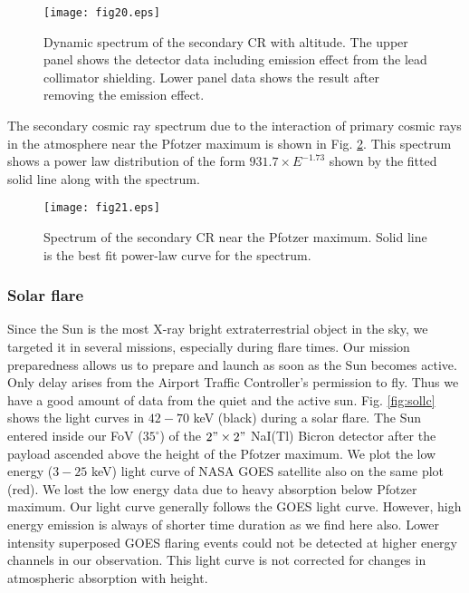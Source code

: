 \begin{figure}[h]
  \centering
  \texttt{[image: fig20.eps]}
  \caption{Dynamic spectrum of the secondary CR with altitude. The upper panel
  shows the detector data including emission effect from the lead collimator 
  shielding. Lower panel data shows the result after removing the emission effect.
  }
  \label{fig:crspec}
\end{figure}

The secondary cosmic ray spectrum due to the interaction of primary cosmic rays
in the atmosphere near the Pfotzer maximum is shown in Fig. \ref{fig:sppfot}.
This spectrum shows a power law distribution of the form $931.7 \times E^{-1.73}$ 
shown by the fitted solid line along with the spectrum.

\begin{figure}[h]
  \centering
  \texttt{[image: fig21.eps]}
  \caption{Spectrum of the secondary CR near the Pfotzer maximum. Solid line 
  is the best fit power-law curve for the spectrum.}
  \label{fig:sppfot}
\end{figure}

\subsubsection{Solar flare}

Since the Sun is the most X-ray bright extraterrestrial object in the
sky, we targeted it in several missions, especially during flare times. Our mission preparedness
allows us to prepare and launch as soon as the Sun becomes active. Only 
delay arises from the Airport Traffic Controller's permission to fly. Thus we have 
a good amount of data from the quiet and the active sun.
Fig. \ref{fig:sollc} shows the light curves in $42-70$ keV (black) 
during a solar flare. The Sun entered inside our FoV ($35^{\circ}$) of the $2"\times2"$
NaI(Tl) Bicron detector \citep{saint} after the payload ascended above the height of
the Pfotzer maximum. We plot the low energy ($3-25$ keV) light curve of NASA GOES satellite
\citep{swpc} also on the same plot 
(red). We lost the low energy data due to heavy absorption below Pfotzer maximum.
Our light curve generally follows the GOES light curve. However, high energy emission \citep{kruc08} 
is always of shorter time duration as we find here also. Lower intensity superposed GOES flaring events 
could not be detected at higher energy channels in our observation. This light 
curve is not corrected for changes in atmospheric absorption with height.

